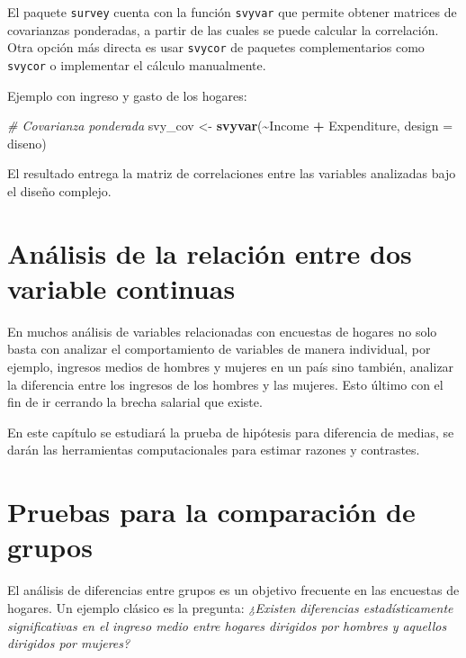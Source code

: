 \documentclass[
  12pt,
]{book}
\newenvironment{Shaded}{\begin{snugshade}}{\end{snugshade}}
\newcommand{\AttributeTok}[1]{\textcolor[rgb]{0.13,0.29,0.53}{#1}}
\newcommand{\CommentTok}[1]{\textcolor[rgb]{0.56,0.35,0.01}{\textit{#1}}}
\newcommand{\FunctionTok}[1]{\textcolor[rgb]{0.13,0.29,0.53}{\textbf{#1}}}
\newcommand{\NormalTok}[1]{#1}
\newcommand{\OtherTok}[1]{\textcolor[rgb]{0.56,0.35,0.01}{#1}}
\newcommand{\SpecialCharTok}[1]{\textcolor[rgb]{0.81,0.36,0.00}{\textbf{#1}}}
\begin{document}
El paquete \texttt{survey} cuenta con la función \texttt{svyvar} que permite obtener matrices de covarianzas ponderadas, a partir de las cuales se puede calcular la correlación. Otra opción más directa es usar \texttt{svycor} de paquetes complementarios como \texttt{svycor} o implementar el cálculo manualmente.

Ejemplo con ingreso y gasto de los hogares:

\begin{Shaded}
\begin{Highlighting}[]
\CommentTok{\# Covarianza ponderada}
\NormalTok{svy\_cov }\OtherTok{\textless{}{-}} \FunctionTok{svyvar}\NormalTok{(}\SpecialCharTok{\textasciitilde{}}\NormalTok{Income }\SpecialCharTok{+}\NormalTok{ Expenditure, }\AttributeTok{design =}\NormalTok{ diseno)}
\end{Highlighting}
\end{Shaded}

El resultado entrega la matriz de correlaciones entre las variables analizadas bajo el diseño complejo.

\section{Análisis de la relación entre dos variable continuas}\label{anuxe1lisis-de-la-relaciuxf3n-entre-dos-variable-continuas}

En muchos análisis de variables relacionadas con encuestas de hogares no solo basta con analizar el comportamiento de variables de manera individual, por ejemplo, ingresos medios de hombres y mujeres en un país sino también, analizar la diferencia entre los ingresos de los hombres y las mujeres. Esto último con el fin de ir cerrando la brecha salarial que existe.

En este capítulo se estudiará la prueba de hipótesis para diferencia de medias, se darán las herramientas computacionales para estimar razones y contrastes.

\section{Pruebas para la comparación de grupos}\label{pruebas-para-la-comparaciuxf3n-de-grupos}

El análisis de diferencias entre grupos es un objetivo frecuente en las encuestas de hogares. Un ejemplo clásico es la pregunta: \emph{¿Existen diferencias estadísticamente significativas en el ingreso medio entre hogares dirigidos por hombres y aquellos dirigidos por mujeres?}
\end{document}
